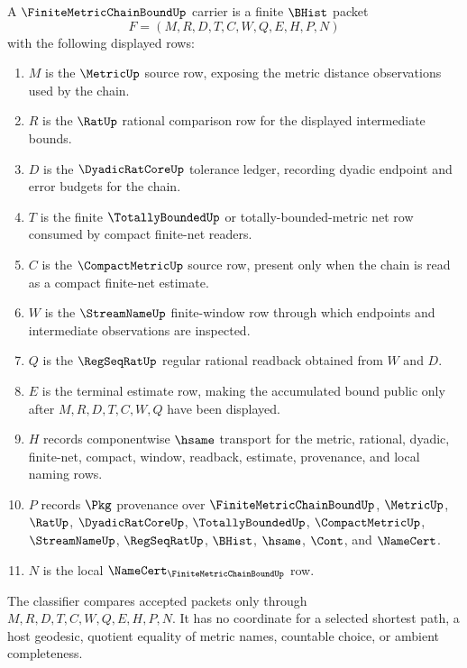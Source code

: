 \begin{definition}
\label{def:finite-metric-chain-bound-carrier}
A $\FiniteMetricChainBoundUp$ carrier is a finite $\BHist$ packet
$$
F=(M,R,D,T,C,W,Q,E,H,P,N)
$$
with the following displayed rows:
\begin{enumerate}
\item $M$ is the $\MetricUp$ source row, exposing the metric distance observations used by the chain.
\item $R$ is the $\RatUp$ rational comparison row for the displayed intermediate bounds.
\item $D$ is the $\DyadicRatCoreUp$ tolerance ledger, recording dyadic endpoint and error budgets for the chain.
\item $T$ is the finite $\TotallyBoundedUp$ or totally-bounded-metric net row consumed by compact finite-net readers.
\item $C$ is the $\CompactMetricUp$ source row, present only when the chain is read as a compact finite-net estimate.
\item $W$ is the $\StreamNameUp$ finite-window row through which endpoints and intermediate observations are inspected.
\item $Q$ is the $\RegSeqRatUp$ regular rational readback obtained from $W$ and $D$.
\item $E$ is the terminal estimate row, making the accumulated bound public only after $M,R,D,T,C,W,Q$ have been displayed.
\item $H$ records componentwise $\hsame$ transport for the metric, rational, dyadic, finite-net, compact, window, readback, estimate, provenance, and local naming rows.
\item $P$ records $\Pkg$ provenance over $\FiniteMetricChainBoundUp$, $\MetricUp$, $\RatUp$, $\DyadicRatCoreUp$, $\TotallyBoundedUp$, $\CompactMetricUp$, $\StreamNameUp$, $\RegSeqRatUp$, $\BHist$, $\hsame$, $\Cont$, and $\NameCert$.
\item $N$ is the local $\NameCert_{\FiniteMetricChainBoundUp}$ row.
\end{enumerate}
The classifier compares accepted packets only through $M,R,D,T,C,W,Q,E,H,P,N$. It has no coordinate for a selected shortest path, a host geodesic, quotient equality of metric names, countable choice, or ambient completeness.
\end{definition}

